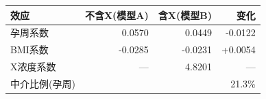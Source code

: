 \begin{tabular}{lrrr}
\toprule
效应 & 不含X(模型A) & 含X(模型B) & 变化 \\
\midrule
孕周系数 & 0.0570 & 0.0449 & -0.0122 \\
BMI系数 & -0.0285 & -0.0231 & +0.0054 \\
X浓度系数 & — & 4.8201 & — \\
\midrule
中介比例(孕周) & \multicolumn{3}{r}{21.3\%} \\
\bottomrule
\end{tabular}
